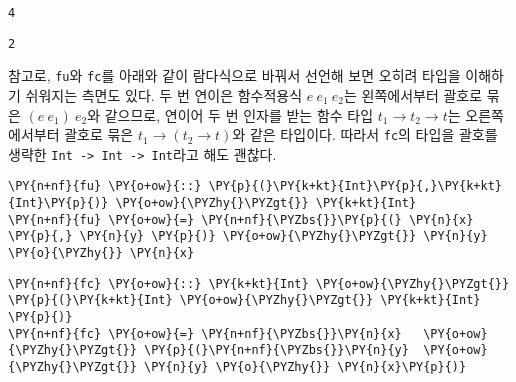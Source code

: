     
    \begin{Verbatim}[commandchars=\\\{\}]
4
    \end{Verbatim}

    
    
    \begin{Verbatim}[commandchars=\\\{\}]
2
    \end{Verbatim}

    
    \noindent 참고로, \texttt{fu}와 \texttt{fc}를 아래와 같이 람다식으로
바꿔서 선언해 보면 오히려 타입을 이해하기 쉬워지는 측면도 있다. 두 번
연이은 함수적용식 \(e~e_1~e_2\)는 왼쪽에서부터 괄호로 묶은
\((e~e_1)~e_2\)와 같으므로, 연이어 두 번 인자를 받는 함수 타입
\(t_1 \to t_2 \to t\)는 오른쪽에서부터 괄호로 묶은
\(t_1 \to (t_2 \to t)\)와 같은 타입이다. 따라서 \texttt{fc}의 타입을
괄호를 생략한
\texttt{Int\ -\textgreater{}\ Int\ -\textgreater{}\ Int}라고 해도
괜찮다.

    \begin{tcolorbox}[breakable, size=fbox, boxrule=1pt, pad at break*=1mm,colback=cellbackground, colframe=cellborder, top=.75ex]
\begin{Verbatim}[commandchars=\\\{\}]
\PY{n+nf}{fu} \PY{o+ow}{::} \PY{p}{(}\PY{k+kt}{Int}\PY{p}{,}\PY{k+kt}{Int}\PY{p}{)} \PY{o+ow}{\PYZhy{}\PYZgt{}} \PY{k+kt}{Int}
\PY{n+nf}{fu} \PY{o+ow}{=} \PY{n+nf}{\PYZbs{}}\PY{p}{(} \PY{n}{x} \PY{p}{,} \PY{n}{y} \PY{p}{)} \PY{o+ow}{\PYZhy{}\PYZgt{}} \PY{n}{y} \PY{o}{\PYZhy{}} \PY{n}{x}
\end{Verbatim}
\end{tcolorbox}

    \begin{tcolorbox}[breakable, size=fbox, boxrule=1pt, pad at break*=1mm,colback=cellbackground, colframe=cellborder, top=.75ex]
\begin{Verbatim}[commandchars=\\\{\}]
\PY{n+nf}{fc} \PY{o+ow}{::} \PY{k+kt}{Int} \PY{o+ow}{\PYZhy{}\PYZgt{}} \PY{p}{(}\PY{k+kt}{Int} \PY{o+ow}{\PYZhy{}\PYZgt{}} \PY{k+kt}{Int}  \PY{p}{)}
\PY{n+nf}{fc} \PY{o+ow}{=} \PY{n+nf}{\PYZbs{}}\PY{n}{x}   \PY{o+ow}{\PYZhy{}\PYZgt{}} \PY{p}{(}\PY{n+nf}{\PYZbs{}}\PY{n}{y}  \PY{o+ow}{\PYZhy{}\PYZgt{}} \PY{n}{y} \PY{o}{\PYZhy{}} \PY{n}{x}\PY{p}{)}
\end{Verbatim}
\end{tcolorbox}

